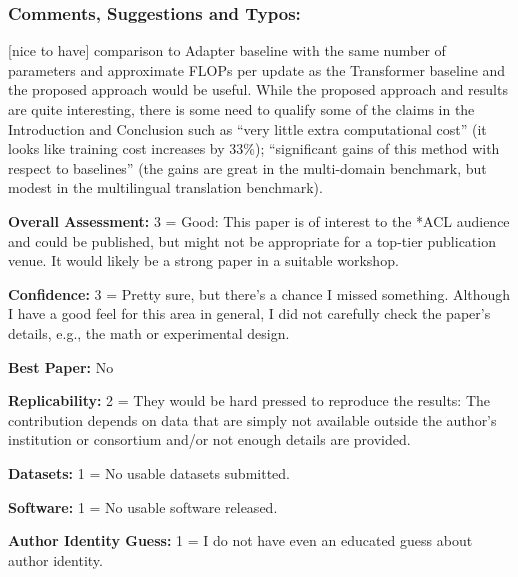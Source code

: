 \documentclass[12pt,times,a4paper,twoside]{article}
\theoremstyle{definition}
\begin{document}
\subsubsection*{Comments, Suggestions and Typos:}
[nice to have] comparison to Adapter baseline with the same number of parameters and approximate FLOPs per update as the Transformer baseline and the proposed approach would be useful.
While the proposed approach and results are quite interesting, there is some need to qualify some of the claims in the Introduction and Conclusion such as “very little extra computational cost” (it looks like training cost increases by 33$\%$); “significant gains of this method with respect to baselines” (the gains are great in the multi-domain benchmark, but modest in the multilingual translation benchmark).

\textbf{Overall Assessment:} 3 = Good: This paper is of interest to the *ACL audience and could be published, but might not be appropriate for a top-tier publication venue. It would likely be a strong paper in a suitable workshop.

\textbf{Confidence:} 3 =  Pretty sure, but there's a chance I missed something. Although I have a good feel for this area in general, I did not carefully check the paper's details, e.g., the math or experimental design.

\textbf{Best Paper:} No

\textbf{Replicability:} 2 = They would be hard pressed to reproduce the results: The contribution depends on data that are simply not available outside the author's institution or consortium and/or not enough details are provided.

\textbf{Datasets:} 1 = No usable datasets submitted.

\textbf{Software:} 1 = No usable software released.

\textbf{Author Identity Guess:} 1 = I do not have even an educated guess about author identity.
\end{document}

